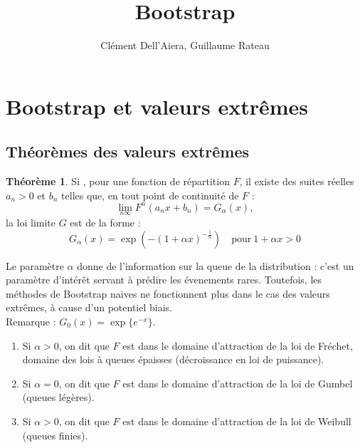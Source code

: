 \documentclass{article}
\title{Bootstrap}
\author{ Cl\'ement Dell'Aiera, Guillaume Rateau}
\date{}
\theoremstyle{definition}
\newtheorem{thm}{Théorème}
\begin{document}
\maketitle

\begin{abstract}

\end{abstract}


\newpage
\tableofcontents

\newpage

\setlength{\parindent}{0cm}
\section{Bootstrap et valeurs extrêmes}

\subsection{Théorèmes des valeurs extrêmes}


\begin{thm}
Si , pour une fonction de répartition $F$, il existe des suites réelles $a_n>0$ et $b_n$ telles que, en tout point de continuité de $F$ :
\[\lim_{n\infty} F^n(a_n x + b_n)=G_\alpha(x),\]
\noindent la loi limite $G$ est de la forme :
\[G_\alpha (x) = \exp(-(1+\alpha x )^{-\frac{1}{\alpha}}) \quad \text{pour} \ 1+\alpha x >0\]
\end{thm}

Le paramètre $\alpha$ donne de l'information sur la queue de la distribution : c'est un paramètre d'intérêt servant à prédire les évenements rares. Toutefois, les méthodes de Bootstrap naives ne fonctionnent plus dans le cas des valeurs extrêmes, à cause d'un potentiel biais.\\

Remarque : $G_0(x)=\exp\{e ^{-x}\}$.\\

\begin{enumerate}
\item Si $\alpha>0$, on dit que $F$ est dans le domaine d'attraction de la loi de Fréchet, domaine des lois à queues épaisses (décroissance en loi de puissance). 
\item Si $\alpha=0$, on dit que $F$ est dans le domaine d'attraction de la loi de Gumbel (queues légères).
\item Si $\alpha>0$, on dit que $F$ est dans le domaine d'attraction de la loi de Weibull (queues finies).
\end{enumerate}
\end{document}

